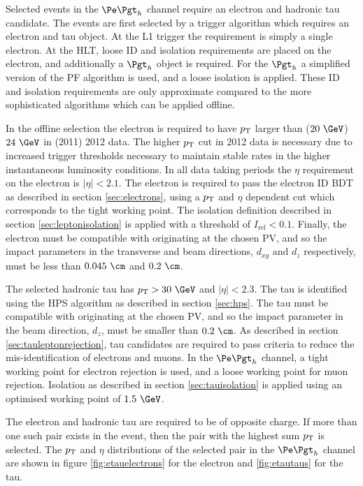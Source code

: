 Selected events in the $\etau$ channel require an electron and hadronic tau
candidate. The events are first selected by a trigger algorithm which requires
an electron and tau object. At the \ac{L1} trigger the requirement is simply a
single electron. At the \ac{HLT}, loose ID and isolation requirements are placed on the
electron, and additionally a $\Pgth$ object is required. For
the $\Pgth$ a simplified version of the \ac{PF} algorithm is used, and a loose
isolation is applied. These ID and isolation requirements are only approximate
compared to the more sophisticated algorithms which can be applied offline.  

In the offline selection the electron is required to have $p_{\mathrm{T}}$ larger than ($20~\GeV$)
$24~\GeV$ in (2011) 2012 data. The higher $p_{\mathrm{T}}$ cut in 2012 data is necessary
due to increased trigger thresholds necessary to maintain stable rates in the
higher instantaneous luminosity conditions. In all data taking periods the $\eta$ requirement
on the electron is $|\eta| < 2.1$. The electron is required to pass the electron
ID \ac{BDT} as described in section \ref{sec:electrons}, using a $p_{\mathrm{T}}$ and
$\eta$ dependent cut which corresponds to the tight working point.  
The isolation definition described in section \ref{sec:leptonisolation} is
applied with a threshold of $I_{\text{rel}} < 0.1$. Finally, the electron must be compatible with
originating at the chosen \ac{PV}, and so the impact parameters in the
transverse and beam directions, $d_{xy}$ and $d_{z}$ respectively, must be 
less than $0.045~\cm$ and $0.2~\cm$. 

The selected hadronic tau has $\pt > 30~\GeV$ and $|\eta|<2.3$. 
The tau is identified using the \ac{HPS} algorithm as described in 
section \ref{sec:hps}. The tau must be compatible with
originating at the chosen \ac{PV}, and so the impact parameter in the beam
direction, $d_{z}$, must be smaller than $0.2~\cm$. 
As described in section \ref{sec:tauleptonrejection}, 
tau candidates are required to pass criteria to reduce the mis-identification of electrons and
muons. In the $\etau$ channel, a tight working point for electron rejection is
used, and a loose working point for muon rejection. Isolation as described in
section \ref{sec:tauisolation} is applied using an optimised working point of
$1.5~\GeV$.  

The electron and hadronic tau are required to be of opposite charge. If more
than one such pair exists in the event, then the pair with the highest sum $p_{\mathrm{T}}$
is selected. The $p_{\mathrm{T}}$ and $\eta$ distributions of the selected pair in the
$\etau$ channel are shown in figure \ref{fig:etauelectrons} for the electron and
\ref{fig:etautaus} for the tau. 


